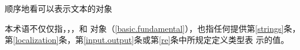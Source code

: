 顺序地看可以表示文本的对象

\begin{note}[\noindent]
  本术语不仅仅指，，，和
  对象（\ref{basic.fundamental}），也指任何提供第\ref{strings}条，
  第\ref{localization}条，第\ref{input.output}条或第\ref{re}条中所规定定义类型表
  示的值。
\end{note}
